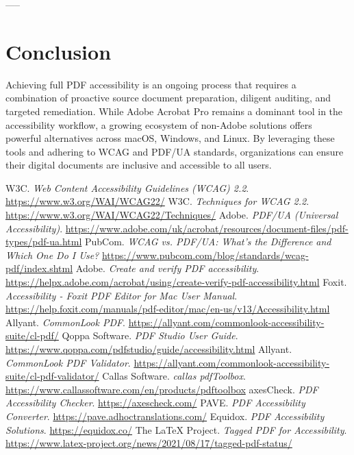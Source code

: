 -----

\section{Conclusion}
\label{sec:conclusion}
Achieving full PDF accessibility is an ongoing process that requires a combination of proactive source document preparation, diligent auditing, and targeted remediation. While Adobe Acrobat Pro remains a dominant tool in the accessibility workflow, a growing ecosystem of non-Adobe solutions offers powerful alternatives across macOS, Windows, and Linux. By leveraging these tools and adhering to WCAG and PDF/UA standards, organizations can ensure their digital documents are inclusive and accessible to all users.

\begin{thebibliography}{99}
 W3C. \textit{Web Content Accessibility Guidelines (WCAG) 2.2}. \url{https://www.w3.org/WAI/WCAG22/}
 W3C. \textit{Techniques for WCAG 2.2}. \url{https://www.w3.org/WAI/WCAG22/Techniques/}
 Adobe. \textit{PDF/UA (Universal Accessibility)}. \url{https://www.adobe.com/uk/acrobat/resources/document-files/pdf-types/pdf-ua.html}
 PubCom. \textit{WCAG vs. PDF/UA: What's the Difference and Which One Do I Use?} \url{https://www.pubcom.com/blog/standards/wcag-pdf/index.shtml}
 Adobe. \textit{Create and verify PDF accessibility}. \url{https://helpx.adobe.com/acrobat/using/create-verify-pdf-accessibility.html}
 Foxit. \textit{Accessibility - Foxit PDF Editor for Mac User Manual}. \url{https://help.foxit.com/manuals/pdf-editor/mac/en-us/v13/Accessibility.html}
 Allyant. \textit{CommonLook PDF}. \url{https://allyant.com/commonlook-accessibility-suite/cl-pdf/}
 Qoppa Software. \textit{PDF Studio User Guide}. \url{https://www.qoppa.com/pdfstudio/guide/accessibility.html}
 Allyant. \textit{CommonLook PDF Validator}. \url{https://allyant.com/commonlook-accessibility-suite/cl-pdf-validator/}
 Callas Software. \textit{callas pdfToolbox}. \url{https://www.callassoftware.com/en/products/pdftoolbox}
 axesCheck. \textit{PDF Accessibility Checker}. \url{https://axescheck.com/}
 PAVE. \textit{PDF Accessibility Converter}. \url{https://pave.adhoctranslations.com/}
 Equidox. \textit{PDF Accessibility Solutions}. \url{https://equidox.co/}
 The LaTeX Project. \textit{Tagged PDF for Accessibility}. \url{https://www.latex-project.org/news/2021/08/17/tagged-pdf-status/}

\end{thebibliography}

